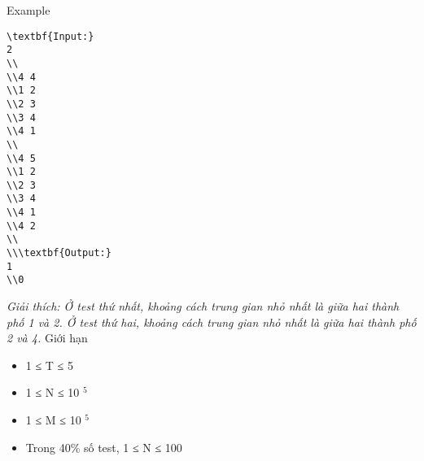 Example
\begin{verbatim}
\textbf{Input:}
2
\\
\\4 4
\\1 2
\\2 3
\\3 4
\\4 1
\\
\\4 5 
\\1 2
\\2 3
\\3 4
\\4 1
\\4 2
\\
\\\textbf{Output:}
1
\\0\end{verbatim}

\emph{    Giải thích: Ở test thứ nhất, khoảng cách trung gian nhỏ nhất là giữa hai thành phố 1 và 2. Ở test thứ hai, khoảng cách trung gian nhỏ nhất là giữa hai thành phố 2 và 4.   }
Giới hạn
\begin{itemize}
	\item     1 ≤ T ≤ 5   
	\item     1 ≤ N ≤ 10    $^     5    $
	\item     1 ≤ M ≤ 10    $^     5    $
	\item     Trong 40\% số test, 1 ≤ N ≤ 100   
\end{itemize}